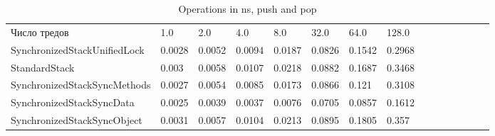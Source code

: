 \documentclass[12pt]{article}
\begin{document}
 \begin{table}[ht!]
	    \caption{Operations in ns, push and pop}
	    \label{sandp}
	    \begin{tabular}{lllllllllllllll}
		Число тредов & 1.0 & 2.0 & 4.0 & 8.0 & 32.0 & 64.0 & 128.0\\
SynchronizedStackUnifiedLock & 0.0028 & 0.0052 & 0.0094 & 0.0187 & 0.0826 & 0.1542 & 0.2968\\
StandardStack & 0.003 & 0.0058 & 0.0107 & 0.0218 & 0.0882 & 0.1687 & 0.3468\\
SynchronizedStackSyncMethods & 0.0027 & 0.0054 & 0.0085 & 0.0173 & 0.0866 & 0.121 & 0.3108\\
SynchronizedStackSyncData & 0.0025 & 0.0039 & 0.0037 & 0.0076 & 0.0705 & 0.0857 & 0.1612\\
SynchronizedStackSyncObject & 0.0031 & 0.0057 & 0.0104 & 0.0213 & 0.0895 & 0.1805 & 0.357\\

	    \end{tabular}
	\end{table}
	
\end{document}
